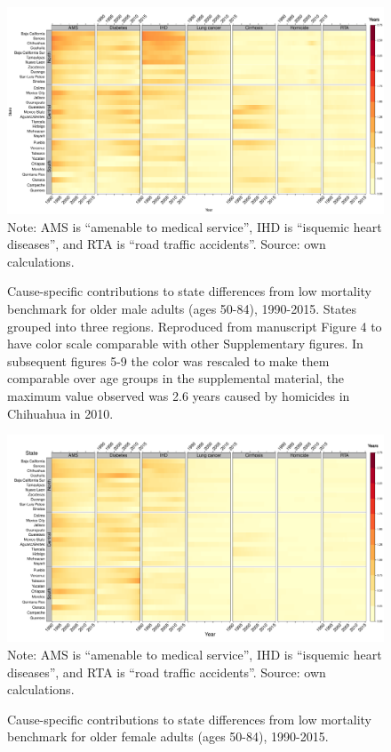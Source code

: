 \documentclass[11.5pt]{article}
\begin{document}
{\begin{figure}[h!]
\centering
\caption{Cause-specific contributions to state differences from low mortality benchmark for older male adults (ages 50-84), 1990-2015. States grouped into three regions. Reproduced from manuscript Figure 4 to have color scale comparable with other Supplementary figures. In subsequent figures 5-9 the color was rescaled to make them comparable over age groups in the supplemental material, the maximum value observed was 2.6 years caused by homicides in Chihuahua in 2010.}
\label{fig:e40_74_males}
\includegraphics[scale=.30]{Figures/Adult_Male_heatmap.pdf}
Note: AMS is ``amenable to medical service'', IHD is ``isquemic heart diseases'', and RTA is ``road traffic accidents''. Source: own calculations. \end{figure}

\begin{figure}[h!]
\centering
\caption{Cause-specific contributions to state differences from low mortality benchmark for older female adults (ages 50-84), 1990-2015.}
\label{fig:e40_74_females}
\includegraphics[scale=.30]{Figures/Adult_Female_heatmap.pdf}
Note: AMS is ``amenable to medical service'', IHD is ``isquemic heart diseases'', and RTA is ``road traffic accidents''. Source: own calculations. \end{figure}


}
\end{document}
